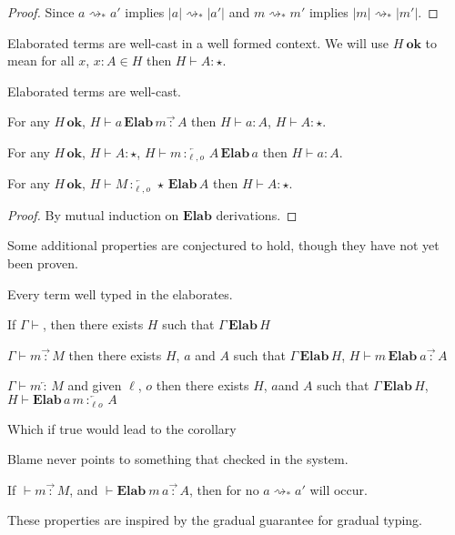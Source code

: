 \begin{proof}
Since $a\rightsquigarrow_{*}a'$ implies $|a|\rightsquigarrow_{*}|a'|$ and $m\rightsquigarrow_{*}m'$ implies $|m|\rightsquigarrow_{*}|m'|$.
\end{proof}

Elaborated terms are well-cast in a well formed context.
We will use $H\ \textbf{ok}$ to mean for all $x$, $x : A \in H$ then $H \vdash A : \star$.

\begin{thm} Elaborated terms are well-cast.
 
For any $H\,\textbf{ok}$, $H\vdash a\,\textbf{Elab}\,m\overrightarrow{\,:\,}A$ then $H\vdash a:A$, $H\vdash A:\star$.
 
For any $H\,\textbf{ok}$, $H\vdash A:\star$, $H\vdash m\overleftarrow{\,:_{\ell,o}\,}A\,\textbf{Elab}\,a$ then $H\vdash a:A$.

For any $H\,\textbf{ok}$, $H\vdash M\overleftarrow{\,:_{\ell,o}\,}\star\,\textbf{Elab}\,A$ then $H\vdash A:\star$.
\end{thm}
\begin{proof}
By mutual induction on $\textbf{Elab}$ derivations.
\end{proof}

Some additional properties are conjectured to hold, though they have not yet been proven.

\begin{conjecture}
Every term well typed in the \bidir{} \slang{} elaborates.
 
If $\Gamma\vdash$, then there exists $H$ such that $\Gamma\,\textbf{Elab}\,H$
 
$\Gamma\vdash m\overrightarrow{\,:\,}M$ then there exists $H$, $a$ and $A$ such that $\Gamma\,\textbf{Elab}\,H$, $H\vdash m\,\textbf{Elab}\ a\overrightarrow{\,:\,}A$
 
$\Gamma\vdash m\overleftarrow{\,:\,}M$ and given $\ell$, $o$ then there exists $H$, $a$and $A$ such that $\Gamma\,\textbf{Elab}\,H$, $H\vdash\textbf{Elab}\,a\,m\overleftarrow{\,:_{\ell o}\,}A$
\end{conjecture}
 
Which if true would lead to the corollary
\begin{conjecture}
Blame never points to something that checked in the \bidir{} system.
 
If $\vdash m\overrightarrow{\,:\,}M$, and $\vdash\textbf{Elab}\ m\,a\overrightarrow{\,:\,}A$, then for no $a\rightsquigarrow_{*}a'$ will  occur.
 
\end{conjecture}
 
These properties are inspired by the gradual guarantee\cite{siek_et_al:LIPIcs:2015:5031} for gradual typing.